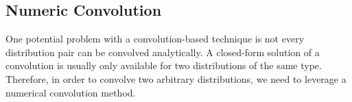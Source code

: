 \documentclass[10pt,sigconf,letterpaper,anonymous,nonacm]{acmart}
\begin{document}





\subsection{Numeric Convolution}
One potential problem with a convolution-based technique is not every distribution pair can be convolved 
analytically.
A closed-form solution of a convolution is usually only available for two distributions of the same type.
Therefore, in order to convolve two arbitrary distributions, we need to leverage a numerical convolution 
method.
\end{document}
